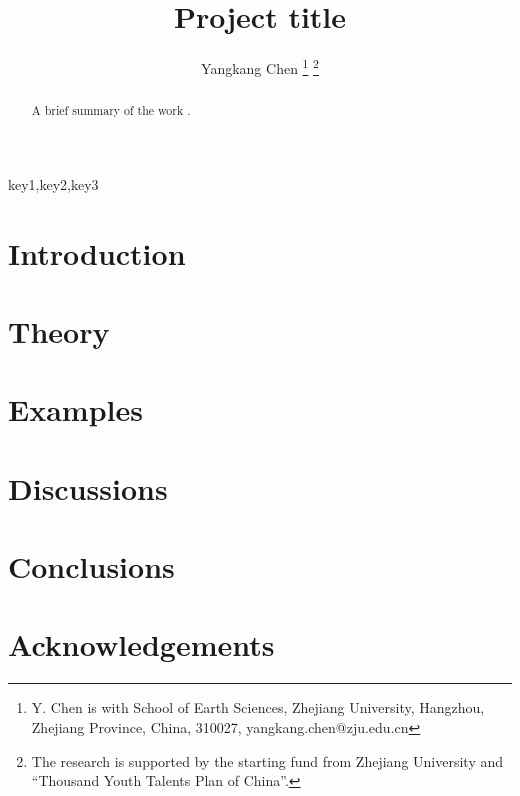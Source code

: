 \title{Project title}
\renewcommand{\thefootnote}{\fnsymbol{footnote}}
\author{Yangkang Chen
\thanks{Y. Chen is with School of Earth Sciences, Zhejiang University, Hangzhou, Zhejiang Province, China, 310027, yangkang.chen@zju.edu.cn}
\thanks{The research is supported by the starting fund from Zhejiang University and ``Thousand Youth Talents Plan of China''.}}
\maketitle

\begin{abstract}
A brief summary of the work \cite{yangkang20142}.
\end{abstract}

\begin{keywords}
key1,key2,key3
\end{keywords}

\section{Introduction}
\section{Theory}
\section{Examples}
\section{Discussions}
\section{Conclusions}
\section{Acknowledgements}
















